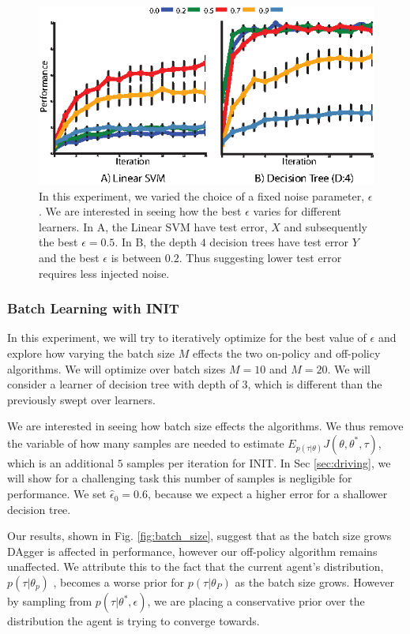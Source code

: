 \documentclass[conference]{article}
\begin{document}
\begin{figure}
\centering
\includegraphics{f_figs/sweeping_eps.eps}
\caption{
    \footnotesize
In this experiment, we varied the choice of a fixed noise parameter, $\epsilon$. We are interested in seeing how the best $\epsilon$ varies for different learners. In A, the Linear SVM have test error, $X$ and subsequently the best $\epsilon = 0.5$. In B, the depth $4$ decision trees have test error $Y$ and the best $\epsilon$ is between $0.2$. Thus suggesting lower test error requires less injected noise. }
\vspace*{-20pt}
\label{fig:sweeep_eps}
\end{figure}




\subsubsection{Batch Learning with INIT}
In this experiment, we will try to iteratively optimize for the best value of $\epsilon$ and explore how varying the batch size $M$ effects the two on-policy and off-policy algorithms. We will optimize over batch sizes $M=10$ and $M=20$. We will consider a learner of decision tree with depth of $3$, which is different than the previously swept over learners. 


We are interested in seeing how batch size effects the algorithms. We thus remove the variable of how many samples are needed to estimate $E_{p(\tau|\theta)} J(\theta,\theta^*,\tau)$, which is an additional $5$ samples per iteration for INIT. In Sec \ref{sec:driving}, we will show for a challenging task this number of samples is negligible for performance. We set $\hat{\epsilon}_0 = 0.6$, because we expect a higher error for a shallower decision tree. 
 
 Our results, shown in Fig. \ref{fig:batch_size}, suggest that as the batch size grows DAgger is  affected in performance, however our off-policy algorithm remains unaffected. We attribute this to the fact that the current agent's distribution, $p(\tau|\theta_p)$ , becomes a worse prior for $p(\tau|\theta_P)$ as the batch size grows. However by sampling from $p(\tau|\theta^*,\epsilon)$, we are placing a conservative prior over the distribution the agent is trying to converge towards.
\end{document}
